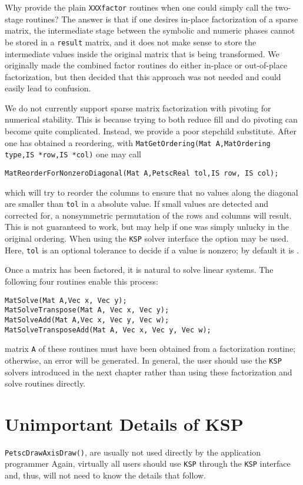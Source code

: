 {{Why provide the plain \lstinline{XXXfactor} routines when one could simply
call the two-stage routines? The answer is that if one desires in-place
factorization of a sparse matrix, the intermediate stage between the
symbolic and numeric phases cannot be stored in a \lstinline{result} matrix, and
it does not make sense to store the intermediate values
inside the original matrix
that is being transformed.  We originally made the combined factor routines
do either in-place or out-of-place factorization, but then decided that
this approach was not needed and could easily lead to confusion.

We do not currently support sparse matrix factorization with pivoting
for numerical stability. This is because trying to both reduce fill
and do pivoting can become quite complicated. Instead, we provide a
poor stepchild substitute. After one has obtained a reordering, with
\lstinline{MatGetOrdering(Mat A,MatOrdering type,IS *row,IS *col)} one
may call
\begin{lstlisting}
MatReorderForNonzeroDiagonal(Mat A,PetscReal tol,IS row, IS col);
\end{lstlisting}
which will try to reorder the columns to ensure that no values along
the diagonal are smaller than \lstinline{tol} in a absolute value. If small
values are detected and corrected for, a nonsymmetric
permutation of the rows and columns will result. This is not guaranteed to work,
but may help if one was simply unlucky in the original ordering.
When using the \lstinline{KSP} solver interface
the option  
may be used.  Here, \lstinline{tol}
is an optional tolerance to decide if a value is nonzero; by default it
is .

Once a matrix has been factored, it is natural to solve linear systems.
The following four routines enable this process: 
\begin{lstlisting}
MatSolve(Mat A,Vec x, Vec y);
MatSolveTranspose(Mat A, Vec x, Vec y);
MatSolveAdd(Mat A,Vec x, Vec y, Vec w);
MatSolveTransposeAdd(Mat A, Vec x, Vec y, Vec w);
\end{lstlisting}
matrix
\lstinline{A} of these routines must have been obtained from a
factorization routine; otherwise, an error will be generated.
In general, the user should use the \lstinline{KSP} solvers introduced in the
next chapter rather than using these factorization and solve routines
directly.

\section{Unimportant Details of KSP}
\lstinline{PetscDrawAxisDraw()}, are usually
not used directly by the application programmer
Again, virtually all users should use \lstinline{KSP} through the \lstinline{KSP} interface
and, thus, will not need to know the details that follow.

}}
